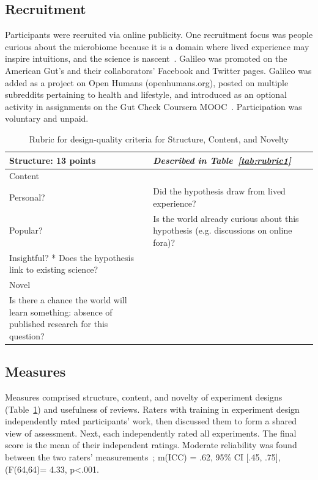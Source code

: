 \subsection*{Recruitment}
Participants were recruited via online publicity. One recruitment focus was people curious about the microbiome because it is a domain where lived experience may inspire intuitions, and the science is nascent~\cite{McDonald2018a}. Galileo was promoted on the American Gut's and their collaborators' Facebook and Twitter pages. Galileo was added as a project on Open Humans (openhumans.org), posted on multiple subreddits pertaining to health and lifestyle, and introduced as an optional activity in assignments on the Gut Check Coursera MOOC~\cite{Knight2016}. Participation was voluntary and unpaid. 


\vspace{0.25in}
\begin{table}[!ht]
\caption[Rubric for design-quality criteria for Structure, Content, and Novelty]
{Rubric for design-quality criteria for Structure, Content, and Novelty}

\vspace{-0.25in}
\begin{center}
\begin{tabular}{|p{1in}|p{2in}|p{3in}|}

\hline
Structure: 13 points &  \textit{Described in Table~\ref{tab:rubric1}} \\

\hline
Content  & \\
\hline
Personal? & Did the hypothesis draw from lived experience? \\
Popular? & Is the world already curious about this hypothesis (e.g. discussions on online fora)?  \\
Insightful? * Does the hypothesis link to existing science?  \\

\hline
Novel  &  \\
\hline
Is there a chance the world will learn something: absence of published research for this question? &  \\

\hline
\end{tabular}
\end{center}
\label{tab:rubric2}
\end{table}

\subsection*{Measures}
Measures comprised structure, content, and novelty of experiment designs (Table~\ref{tab:rubric2}) and usefulness of reviews. Raters with training in experiment design independently rated participants' work, then discussed them to form a shared view of assessment. Next, each independently rated all experiments. The final score is the mean of their independent ratings. Moderate reliability was found between the two raters' measurements~\cite{koo2016guideline}; m(ICC) = .62, 95\% CI [.45, .75], (F(64,64)= 4.33, p<.001. 


